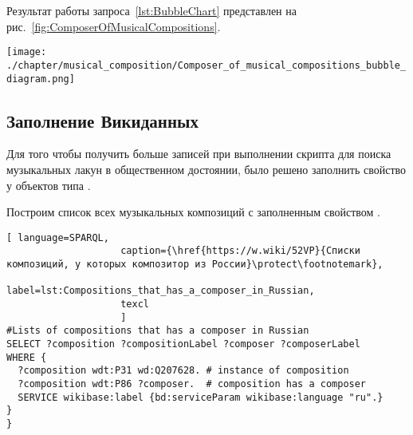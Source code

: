 Результат работы запроса~\ref{lst:BubbleChart} представлен на рис.~\ref{fig:ComposerOfMusicalCompositions}.

\begin{fullwidth}
\begin{figure*}[ht]
	\texttt{[image: ./chapter/musical\_composition/Composer\_of\_musical\_compositions\_bubble\_diagram.png]}
	\caption[Пузырьковая диаграмма композиторов по количеству написанных композиций.]{Размер круга означает количество написанных музыкальных композиций. Диаграмма показывает, что у одних композиторов значительно больше композиций чем у других. В первую пятерку входят \href{https://ru.wikipedia.org/wiki/Гаде,_Нильс}{Нильс Гаде} (\num{173} композиции), \href{https://ru.wikipedia.org/wiki/Бах,_Иоганн_Себастьян}{Иоганн Себастьян Бах} (\num{155} композиций), \href{https://ru.wikipedia.org/wiki/Синдинг,_Кристиан_Август}{Кристиан Август Синдинг} (\num{125} композиций), \href{https://ru.wikipedia.org/wiki/Хальворсен,_Юхан}{Юхан Хальворсен} (\num{121} композиция), \href{https://ru.wikipedia.org/wiki/Хованесс,_Алан}{Алан Хованесс} (\num{108} композиций). Карта построена с помощью запроса~\protect\ref{lst:BubbleChart}.}%
      \label{fig:ComposerOfMusicalCompositions}%
\end{figure*} 
\end{fullwidth}



\subsection{Заполнение Викиданных}
Для того чтобы получить больше записей при выполнении скрипта для поиска музыкальных лакун в общественном достоянии, было решено заполнить свойство  у объектов типа .

Построим список всех музыкальных композиций с заполненным свойством .

\begin{lstlisting}[ language=SPARQL,
                    caption={\href{https://w.wiki/52VP}{Списки композиций, у которых композитор из России}\protect\footnotemark},
                    label=lst:Compositions_that_has_a_composer_in_Russian,
                    texcl 
                    ]
#Lists of compositions that has a composer in Russian 
SELECT ?composition ?compositionLabel ?composer ?composerLabel 
WHERE {
  ?composition wdt:P31 wd:Q207628. # instance of composition
  ?composition wdt:P86 ?composer.  # composition has a composer
  SERVICE wikibase:label {bd:serviceParam wikibase:language "ru".}
}
}
\end{lstlisting}%



